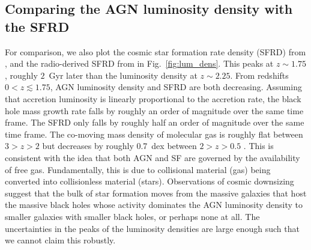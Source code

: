 \documentclass[twocolumn, trackchanges]{aastex63}
\begin{document}
\subsection{Comparing the AGN luminosity density with the SFRD}
For comparison, we also plot the cosmic star formation rate density (SFRD) from \cite{madau_cosmic_2014}, \cite{zavala_evolution_2021} and the radio-derived SFRD from \cite{matthews_cosmic_2021} in Fig.~\ref{fig:lum_dens}.
This peaks at $z\sim 1.75$, roughly $2$~Gyr later than the luminosity density at $z\sim 2.25$.
From redshifts $0 < z \lesssim 1.75$, AGN luminosity density and SFRD are both decreasing.
Assuming that accretion luminosity is linearly proportional to the accretion rate, the black hole mass growth rate falls by roughly an order of magnitude over the same time frame. 
The SFRD only falls by roughly half an order of magnitude over the same time frame.
The co-moving mass density of molecular gas is roughly flat between $3 > z > 2$ but decreases by roughly \SI{0.7}{dex} between $2>z>0.5$ \citep{yan_alpine-alma_2020, garratt_cosmic_2021}.
This is consistent with the idea that both AGN and SF are governed by the availability of free gas.
Fundamentally, this is due to collisional material (gas) being converted into collisionless material (stars).
Observations of cosmic downsizing \citep{2005ApJ...619L.135J} suggest that the bulk of star formation moves from the massive galaxies that host the massive black holes whose activity dominates the AGN luminosity density to smaller galaxies with smaller black holes, or perhaps none at all.
The uncertainties in the peaks of the luminosity densities are large enough such that we cannot claim this robustly.
\end{document}
